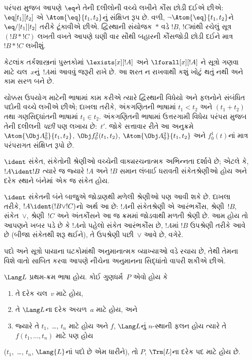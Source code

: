 પરંપરા મુજબ આપણે $\eq$ને તેની દલીલોની વચ્ચે લખીને કૌંસ છોડી દઈએ
છીએ: $\eq[t_1][t_2]$ એ $\Atom{\eq}{t_1,t_2}$નું સંક્ષિપ્ત રૂપ છે.
વળી, $\lnot \Atom{\eq}{t_1,t_2}$ને $\eq/[t_1][t_2]$ તરીકે ટૂંકાવીએ
છીએ. દ્વિસ્થાની સંયોજક~$\ast$ વડે $!B$, $!C$માંથી રચેલું સૂત્ર
$(!B \ast !C)$ લખતી વખતે આપણે ઘણી વાર સૌથી બહારની કૌંસજોડી છોડી
દઈને માત્ર~$!B \ast !C$ લખીશું.

\begin{intro}
કેટલાંક તર્કશાસ્ત્રનાં પુસ્તકોમાં
$\lexists[x][!A]$ %
અને %
$\lforall[x][!A]$ %
ને
સૂત્રો
ગણવા માટે ચલ~$x$નું~$!A$માં આવવું જરૂરી રાખે છે. આ શરત
ન રાખવાથી કશું ખોટું થતું નથી અને કામ સરળ બને છે.
\end{intro}



ચોક્કસ ઉપયોગ માટેની ભાષામાં કામ કરીએ ત્યારે દ્વિસ્થાની
વિધેયો અને ફલનોને સંબંધિત પદોની વચ્ચે લખીએ છીએ;
દાખલા તરીકે, અંકગણિતની ભાષામાં $t_1<t_2$ અને $(t_1+t_2)$ તથા
ગણસિદ્ધાંતની ભાષામાં $t_1\in t_2$. અંકગણિતની ભાષામાં ઉત્તરગામી
વિધેય પરંપરા મુજબ તેની દલીલની \emph{પછી} પણ લખાય છે:~$t'$. જોકે
સત્તાવાર રીતે આ અનુક્રમે $\Atom{\Obj A^2_0}{t_1,t_2}$,
$\Obj f^2_0(t_1,t_2)$, $\Atom{\Obj A^2_0}{t_1,t_2}$ અને
$f^1_0(t)$નાં માત્ર પરંપરાગત સંક્ષિપ્ત રૂપો છે.

\begin{defn}[વાક્યરચનાત્મક અભિન્નતા]
$\ident$ સંકેત, સંકેતોની શ્રેણીઓ વચ્ચેની વાક્યરચનાત્મક અભિન્નતા
દર્શાવે છે; એટલે કે, $!A \ident !B$ ત્યારે જ જ્યારે $!A$ અને $!B$
સમાન લંબાઈ ધરાવતી સંકેતશ્રેણીઓ હોય અને દરેક સ્થાને બંનેમાં એક જ
સંકેત હોય.
\end{defn}

$\ident$ સંકેતની બંને બાજુએ જોડાણથી મળેલી શ્રેણીઓ પણ આવી શકે છે.
દાખલા તરીકે, $!A \ident (!B \lor !C)$નો અર્થ આ છે: $!A$ની
સંકેતશ્રેણી એ આરંભકૌંસ, શ્રેણી~$!B$, સંકેત~$\lor$, શ્રેણી~$!C$ અને
અંતકૌંસને આ જ ક્રમમાં જોડવાથી મળતી શ્રેણી છે. આમ હોય તો આપણને ખબર
પડે છે કે $!A$નો પહેલો સંકેત આરંભકૌંસ છે, $!A$માં $!B$ ઉપશ્રેણી
તરીકે આવે છે (બીજા સંકેતથી શરૂ થઈને), તે ઉપશ્રેણી પછી~$\lor$ આવે છે,
વગેરે.

પદો અને સૂત્રો પાયાના ઘટકોમાંથી અનુમાનાત્મક વ્યાખ્યાઓ વડે
રચાય છે, તેથી તેમના વિશે વાતો સાબિત કરવા આપણે નીચેના અનુમાનના
સિદ્ધાંતો વાપરી શકીએ છીએ.

\begin{lem}[\emph{પદો પર અનુમાનનો સિદ્ધાંત}]
    $\Lang L$ પ્રથમ-ક્રમ ભાષા હોય. કોઈ ગુણધર્મ~$P$ એવો હોય કે
    \begin{enumerate}
        \item તે દરેક ચલ~$v$ માટે હોય,
        \item તે $\Lang L$ના દરેક અચળ~$a$ માટે હોય, અને
        \item જ્યારે તે $t_1$,~\dots, $t_n$ માટે હોય અને $f$,
        $\Lang L$નું $n$-સ્થાની ફલન હોય ત્યારે તે
        $f(t_1,\dotsc,t_n)$ માટે પણ હોય
    \end{enumerate}
    ($t_1$,~\dots, $t_n$, $\Lang{L}$નાં પદો છે એમ ધારીને),
    તો $P$, $\Trm[L]$ના દરેક પદ માટે હોય છે.
\end{lem}

